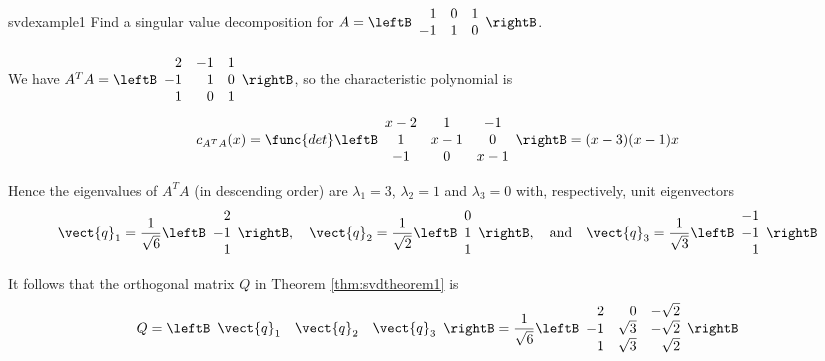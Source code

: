 \begin{example}{}{svdexample1}
Find a singular value decomposition for $A=
\leftB 
\begin{array}{rrr}
1 & 0 & 1 \\ 
-1 & 1 & 0
\end{array}
\rightB$.

\begin{solution} We have $A^{T}A=
\leftB 
\begin{array}{rrr}
2 & -1 & 1 \\ 
-1 & 1 & 0 \\ 
1 & 0 & 1
\end{array}
\rightB$, so the characteristic polynomial is 
\begin{equation*}
c_{A^{T}A}(x)=\func{det}
\leftB 
\begin{array}{ccc}
x-2 & 1 & -1 \\ 
1 & x-1 & 0 \\ 
-1 & 0 & x-1
\end{array}
\rightB =(x-3)(x-1)x
\end{equation*}

\noindent Hence the eigenvalues of $A^{T}A$ (in descending order) are $\lambda_{1}=3$, $\lambda_{2}=1$ and $\lambda_{3}=0$ with, respectively, unit eigenvectors 
\begin{equation*}
\vect{q}_{1}=\frac{1}{\sqrt{6}}
\leftB 
\begin{array}{r}
2 \\ 
-1 \\ 
1
\end{array}
\rightB, \quad  \vect{q}_{2}=\frac{1}{\sqrt{2}}
\leftB 
\begin{array}{r}
0 \\ 
1 \\ 
1
\end{array}
\rightB,\quad  \mbox{and} \quad \vect{q}_{3}=\frac{1}{\sqrt{3}}
\leftB 
\begin{array}{r}
-1 \\ 
-1 \\ 
1
\end{array}
\rightB
\end{equation*}

\noindent It follows that the orthogonal matrix $Q$ in Theorem \ref{thm:svdtheorem1} is
\begin{equation*}
Q=\leftB \begin{array}{ccc}\vect{q}_{1} & \vect{q}_{2} & \vect{q}_{3}\end{array}\rightB=\frac{1}{\sqrt{6}}
\leftB 
\begin{array}{rrr}
2 & 0 & -\sqrt{2} \\ 
-1 & \sqrt{3} & -\sqrt{2} \\ 
1 & \sqrt{3} & \sqrt{2}
\end{array}
\rightB 
\end{equation*}


\end{solution}
\end{example}
